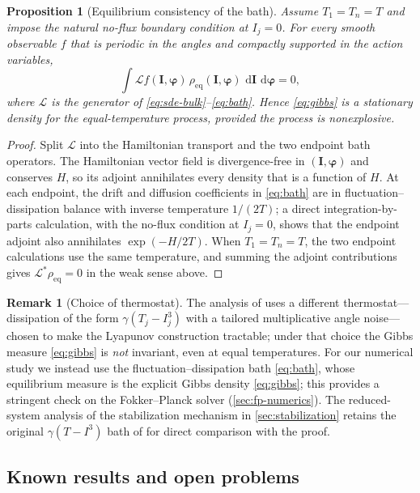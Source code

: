 \documentclass[11pt,a4paper]{article}
\newtheorem{proposition}[theorem]{Proposition}
\theoremstyle{definition}
\newtheorem{remark}[theorem]{Remark}
\newcommand{\dd}{\,\mathrm{d}}
\numberwithin{equation}{section}   %
\newcommand{\bI}{\mathbf{I}}
\newcommand{\bphi}{\boldsymbol{\varphi}}
\newcommand{\Lgen}{\mathcal{L}}
\newcommand{\Ladj}{\mathcal{L}^{*}}
\begin{document}
\begin{proposition}[Equilibrium consistency of the bath]\label{prop:gibbs-bath}
Assume $T_1=T_n=T$ and impose the natural no-flux boundary condition at
$I_j=0$. For every smooth observable $f$ that is periodic in the angles and
compactly supported in the action variables,
\[
  \int \Lgen f(\bI,\bphi)\,\rho_{\mathrm{eq}}(\bI,\bphi)\,\dd\bI\,\dd\bphi=0,
\]
where $\Lgen$ is the generator of \eqref{eq:sde-bulk}--\eqref{eq:bath}. Hence
\eqref{eq:gibbs} is a stationary density for the equal-temperature process,
provided the process is nonexplosive.
\end{proposition}

\begin{proof}
Split $\Lgen$ into the Hamiltonian transport and the two endpoint bath
operators. The Hamiltonian vector field is divergence-free in
$(\bI,\bphi)$ and conserves $H$, so its adjoint annihilates every density that
is a function of $H$. At each endpoint, the drift and diffusion coefficients in
\eqref{eq:bath} are in fluctuation--dissipation balance with inverse
temperature $1/(2T)$; a direct integration-by-parts calculation, with the
no-flux condition at $I_j=0$, shows that the endpoint adjoint also annihilates
$\exp(-H/2T)$. When $T_1=T_n=T$, the two endpoint calculations use the same
temperature, and summing the adjoint contributions gives
$\Ladj\rho_{\mathrm{eq}}=0$ in the weak sense above.
\end{proof}

\begin{remark}[Choice of thermostat]\label{rem:bath}
The analysis of \cite{HLNS} uses a different thermostat---dissipation of the form
$\gamma(T_j-I_j^3)$ with a tailored multiplicative angle noise---chosen to make
the Lyapunov construction tractable; under that choice the Gibbs measure
\eqref{eq:gibbs} is \emph{not} invariant, even at equal temperatures. For our
numerical study we instead use the fluctuation--dissipation bath
\eqref{eq:bath}, whose equilibrium measure is the explicit Gibbs density
\eqref{eq:gibbs}; this provides a stringent check on the Fokker--Planck solver
(\cref{sec:fp-numerics}). The reduced-system analysis of the stabilization
mechanism in \cref{sec:stabilization} retains the original $\gamma(T-I^3)$ bath
of \cite{HLNS} for direct comparison with the proof.
\end{remark}

\subsection{Known results and open problems}\label{sec:known}
\end{document}
